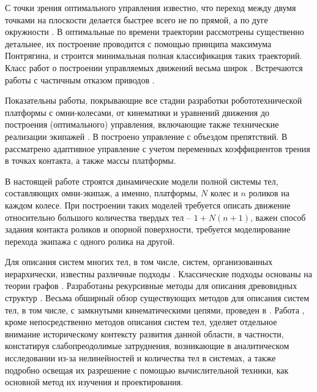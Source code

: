 С точки зрения оптимального управления известно, что переход между двумя точками на плоскости делается быстрее всего не по прямой, а по дуге окружности \cite{Ashmore2002a}. В \cite{Balkcom2006} оптимальные по времени траектории рассмотрены существенно детальнее, их построение проводится с помощью принципа максимума Понтрягина, и строится минимальная полная классификация таких траекторий. Класс работ о построении управляемых движений весьма широк \cite{Huang2015,Bramanta2017,Kalmar-Nagy2016,Szayer2017}. Встречаются работы с частичным отказом приводов \cite{Field2017,Ivanov2015a}.

Показательны работы, покрывающие все стадии разработки робототехнической платформы с омни-колесами, от кинематики и уравнений движения до построения (оптимального) управления, включающие также технические реализации экипажей \cite{Williams2002,Purwin2006,Li2009}. В \cite{Galicki2009} построено управление с объездом препятствий. В \cite{Lin2013} рассматрено адаптивное управление с учетом переменных коэффициентов трения в точках контакта, а также массы платформы.

В настоящей работе строятся динамические модели полной системы тел, составляющих омни-экипаж, а именно, платформы, $N$ колес и $n$ роликов на каждом колесе. При построении таких моделей требуется описать движение относительно большого количества твердых тел -- $1 + N(n + 1)$, важен способ задания контакта роликов и опорной поверхности, требуется моделирование перехода экипажа с одного ролика на другой.

Для описания систем многих тел, в том числе, систем, организованных иерархически, известны различные подходы \cite{Wittenburg2008,EberhardSchiehlen,Jain2011,Roberson1988,Jerkovsky1977}. Классические подходы основаны на теории графов \cite{Wittenburg2008,Jerkovsky1977}. Разработаны рекурсивные методы для описания древовидных структур \cite{EberhardSchiehlen}. Весьма обширный обзор существующих методов для описания систем тел, в том числе, с замкнутыми кинематическими цепями, проведен в \cite{Jain2011}. Работа \cite{Roberson1988}, кроме непосредственно методов описания систем тел, уделяет отдельное внимание историческому контексту развития данной области, в частности, констатируя слабопреодолимые затруднения, возникающие в аналитическом исследовании из-за нелинейностей и количества тел в системах, а также подробно освещая их разрешение с помощью вычислительной техники, как основной метод их изучения и проектирования.

